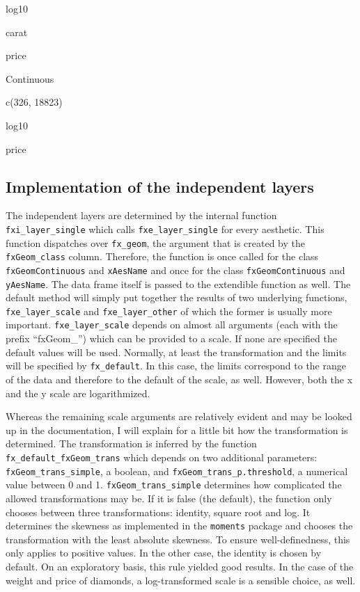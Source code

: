 \documentclass[]{report}
\theoremstyle{definition}
\theoremstyle{definition}
\theoremstyle{definition}
\theoremstyle{remark}
\begin{document}
log10

carat

price

Continuous

c(326, 18823)

log10

price

\subsection{Implementation of the independent
layers}\label{implementation-of-the-independent-layers}

The independent layers are determined by the internal function
\texttt{fxi\_layer\_single} which calls \texttt{fxe\_layer\_single} for
every aesthetic. This function dispatches over \texttt{fx\_geom}, the
argument that is created by the \texttt{fxGeom\_class} column.
Therefore, the function is once called for the class
\texttt{fxGeomContinuous} and \texttt{xAesName} and once for the class
\texttt{fxGeomContinuous} and \texttt{yAesName}. The data frame itself
is passed to the extendible function as well. The default method will
simply put together the results of two underlying functions,
\texttt{fxe\_layer\_scale} and \texttt{fxe\_layer\_other} of which the
former is usually more important. \texttt{fxe\_layer\_scale} depends on
almost all arguments (each with the prefix ``fxGeom\_'') which can be
provided to a scale. If none are specified the default values will be
used. Normally, at least the transformation and the limits will be
specified by \texttt{fx\_default}. In this case, the limits correspond
to the range of the data and therefore to the default of the scale, as
well. However, both the x and the y scale are logarithmized.

Whereas the remaining scale arguments are relatively evident and may be
looked up in the documentation, I will explain for a little bit how the
transformation is determined. The transformation is inferred by the
function \texttt{fx\_default\_fxGeom\_trans} which depends on two
additional parameters: \texttt{fxGeom\_trans\_simple}, a boolean, and
\texttt{fxGeom\_trans\_p.threshold}, a numerical value between 0 and 1.
\texttt{fxGeom\_trans\_simple} determines how complicated the allowed
transformations may be. If it is false (the default), the function only
chooses between three transformations: identity, square root and log. It
determines the skewness as implemented in the \texttt{moments} package
\citep{moments} and chooses the transformation with the least absolute
skewness. To ensure well-definedness, this only applies to positive
values. In the other case, the identity is chosen by default. On an
exploratory basis, this rule yielded good results. In the case of the
weight and price of diamonds, a log-transformed scale is a sensible
choice, as well.
\end{document}
